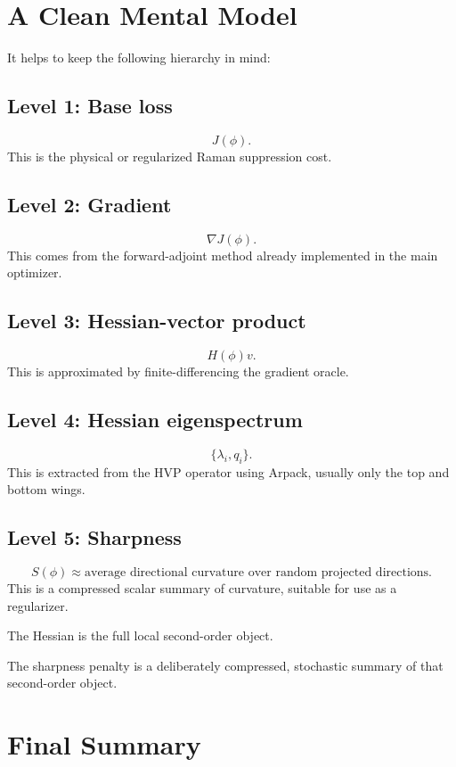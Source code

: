 \documentclass[11pt,letterpaper]{article}
\begin{document}
\section{A Clean Mental Model}

It helps to keep the following hierarchy in mind:

\subsection*{Level 1: Base loss}
\[
J(\phi).
\]
This is the physical or regularized Raman suppression cost.

\subsection*{Level 2: Gradient}
\[
\nabla J(\phi).
\]
This comes from the forward-adjoint method already implemented in the main
optimizer.

\subsection*{Level 3: Hessian-vector product}
\[
H(\phi)v.
\]
This is approximated by finite-differencing the gradient oracle.

\subsection*{Level 4: Hessian eigenspectrum}
\[
\{\lambda_i, q_i\}.
\]
This is extracted from the HVP operator using Arpack, usually only the top and
bottom wings.

\subsection*{Level 5: Sharpness}
\[
S(\phi) \approx \text{average directional curvature over random projected
directions}.
\]
This is a compressed scalar summary of curvature, suitable for use as a
regularizer.

\begin{keyidea}
The Hessian is the full local second-order object.

The sharpness penalty is a deliberately compressed, stochastic summary of that
second-order object.
\end{keyidea}

\section{Final Summary}
\end{document}
